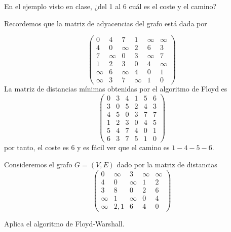 \documentclass[twoside]{article}
\begin{document}
\newpage



\begin{ejercicio}{2.2}
En el ejemplo visto en clase, ¿del 1 al 6 cuál es el coste y el camino?
\end{ejercicio}
Recordemos que la matriz de adyacencias del grafo está dada por
\begin{solucion}
$$
\begin{pmatrix}
0 		& 4 		& 7 		& 1 	& \infty 	& \infty\\
4 		& 0 		& \infty 	& 2 	& 6		 	& 3\\
7 		& \infty 	& 0 		& 3 	& \infty 	& 7\\
1 		& 2 		& 3 		& 0 	& 4 		& \infty\\
\infty 	& 6 		& \infty 	& 4 	& 0		 	& 1\\
\infty 	& 3 		& 7 		& \infty 	& 1 	& 0
\end{pmatrix}
$$
La matriz de distancias mínimas obtenidas por el algoritmo de Floyd es
$$
\begin{pmatrix}
0	& 3 	& 4 	& 1 	& 5		& 6\\
3  	& 0 	& 5 	& 2 	& 4		& 3\\
4  	& 5 	& 0 	& 3 	& 7 	& 7\\
1  	& 2 	& 3 	& 0 	& 4 	& 5\\
5 	& 4 	& 7 	& 4 	& 0		& 1\\
6 	& 3 	& 7 	& 5 	& 1 	& 0
\end{pmatrix}
$$
por tanto, el coste es 6 y es fácil ver que el camino es $1-4-5-6$.
\end{solucion}
\newpage
\begin{ejercicio}{2.3}
Consideremos el grafo $G=(V,E)$ dado por la matriz de distancias
$$
\begin{pmatrix}
0		& \infty 	& 3 		& \infty 	& \infty\\
4 		& 0			& \infty	& 1			& 2\\
3		& 8			& 0			& 2			& 6\\
\infty	& 1			& \infty	& 0			& 4\\
\infty	& 2,1		& 6			& 4			& 0
\end{pmatrix}
$$
\end{ejercicio}
Aplica el algoritmo de Floyd-Warshall.
\end{document}
